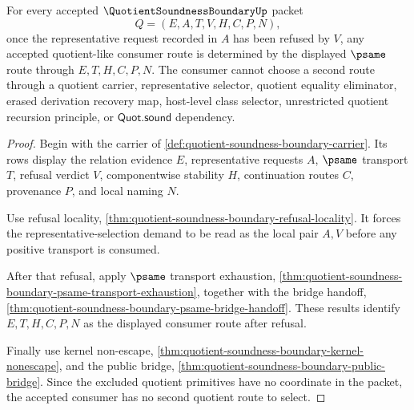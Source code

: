 \begin{theorem}
\label{thm:quotient-soundness-boundary-refusal-transport-determinacy}
For every accepted $\QuotientSoundnessBoundaryUp$ packet
$$
Q=(E,A,T,V,H,C,P,N),
$$
once the representative request recorded in $A$ has been refused by $V$, any accepted quotient-like consumer route is determined by the displayed $\psame$ route through $E,T,H,C,P,N$. The consumer cannot choose a second route through a quotient carrier, representative selector, quotient equality eliminator, erased derivation recovery map, host-level class selector, unrestricted quotient recursion principle, or $\mathsf{Quot.sound}$ dependency.
\end{theorem}
\begin{proof}
Begin with the carrier of \autoref{def:quotient-soundness-boundary-carrier}. Its rows display the relation evidence $E$, representative requests $A$, $\psame$ transport $T$, refusal verdict $V$, componentwise stability $H$, continuation routes $C$, provenance $P$, and local naming $N$.

Use refusal locality, \autoref{thm:quotient-soundness-boundary-refusal-locality}. It forces the representative-selection demand to be read as the local pair $A,V$ before any positive transport is consumed.

After that refusal, apply $\psame$ transport exhaustion, \autoref{thm:quotient-soundness-boundary-psame-transport-exhaustion}, together with the bridge handoff, \autoref{thm:quotient-soundness-boundary-psame-bridge-handoff}. These results identify $E,T,H,C,P,N$ as the displayed consumer route after refusal.

Finally use kernel non-escape, \autoref{thm:quotient-soundness-boundary-kernel-nonescape}, and the public bridge, \autoref{thm:quotient-soundness-boundary-public-bridge}. Since the excluded quotient primitives have no coordinate in the packet, the accepted consumer has no second quotient route to select.
\end{proof}

